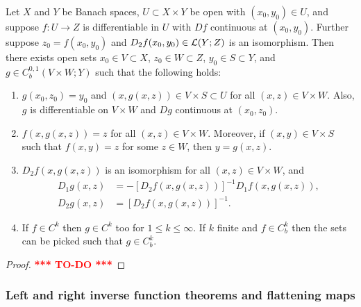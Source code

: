 \documentclass[a4paper]{article}
\newcommand{\TODO}{\textcolor{red}{\textbf{*** TO-DO ***}}}
\begin{document}
\begin{thm}
  Let $X$ and $Y$ be Banach spaces, $U \subset X \times Y$
  be open with $(x_0, y_0) \in U$, and suppose $f: U \to Z$
  is differentiable in $U$ with $Df$ continuous
  at $(x_0, y_0)$. Further suppose $z_0 = f(x_0, y_0)$
  and $D_2 f(x_0, y_0) \in \mathcal{L}(Y; Z)$ is an isomorphism.
  Then there exists open sets $x_0 \in V \subset X$,
  $z_0 \in W \subset Z$, $y_0 \in S \subset Y$, and
  $g \in C^{0,1}_b (V \times W ; Y)$ such that the following
  holds:
  \begin{enumerate}
    \item $g(x_0, z_0) = y_0$ and $(x, g(x, z)) \in V \times S
    \subset U$ for all $(x, z) \in V \times W$. Also, $g$
    is differentiable on $V \times W$ and $Dg$ continuous at
    $(x_0, z_0)$.

    \item $f(x, g(x, z)) = z$ for all $(x, z) \in V \times W$.
    Moreover, if $(x, y) \in V \times S$ such that
    $f(x, y) = z$ for some $z \in W$, then $y = g(x, z)$.

    \item $D_2 f(x, g(x, z))$ is an isomorphism for all
    $(x, z) \in V \times W$, and
    \[
    \begin{aligned}
      D_1 g(x, z) &= - \left[ D_2 f(x, g(x, z)) \right]^{-1}
      D_1 f (x, g(x, z)), \\
      D_2 g(x, z) &= \left[ D_2 f(x, g(x, z)) \right]^{-1}.
    \end{aligned}
    \]

    \item If $f \in C^k$ then $g \in C^k$ too for $1 \leq k
    \leq \infty$. If $k$ finite and $f \in C^k_b$ then the
    sets can be picked such that $g \in C^k_b$.
  \end{enumerate}
\end{thm}

\begin{proof}
  \TODO
\end{proof}



\subsubsection{Left and right inverse function theorems and 
flattening maps}
\end{document}
